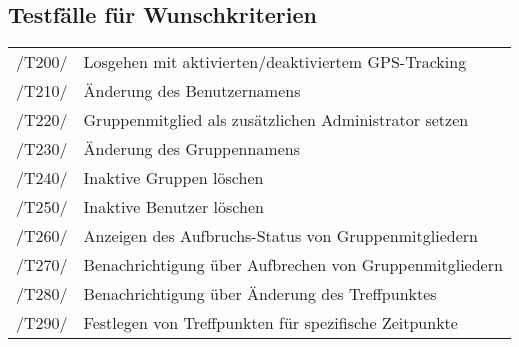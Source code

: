 \subsection{Testfälle für Wunschkriterien}
\begin{tabular}{ll}
/T200/ & Losgehen mit aktivierten/deaktiviertem GPS-Tracking \\ %
/T210/ & Änderung des Benutzernamens \\
/T220/ & Gruppenmitglied als zusätzlichen Administrator setzen \\
/T230/ & Änderung des Gruppennamens \\
/T240/ & Inaktive Gruppen löschen \\
/T250/ & Inaktive Benutzer löschen \\
/T260/ & Anzeigen des Aufbruchs-Status von Gruppenmitgliedern \\
/T270/ & Benachrichtigung über Aufbrechen von Gruppenmitgliedern \\
/T280/ & Benachrichtigung über Änderung des Treffpunktes \\
/T290/ & Festlegen von Treffpunkten für spezifische Zeitpunkte \\
\end{tabular}
